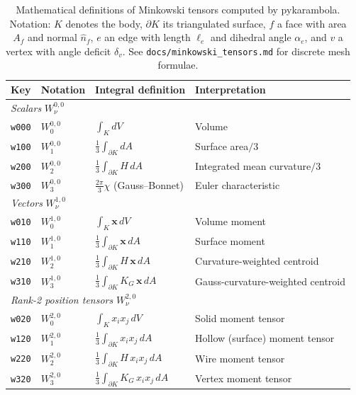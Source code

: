 \documentclass[times, twoside, watermark]{zHenriquesLab-StyleBioRxiv}
\newcommand{\newtxt}[1]{\textcolor{chgadded}{#1}}
\renewcommand{\added}[2][]{\newtxt{#2}}
\begin{document}
\added{%
\begin{table}[!ht]
\centering
\caption{%
  Mathematical definitions of Minkowski tensors computed by pykarambola.
  Notation: $K$ denotes the body, $\partial K$ its triangulated surface, $f$ a face with area $A_f$ and normal $\hat{n}_f$, $e$ an edge with length $\ell_e$ and dihedral angle $\alpha_e$, and $v$ a vertex with angle deficit $\delta_v$.
  See \texttt{docs/minkowski\_tensors.md} for discrete mesh formulae.
}
\label{tab:tensors}
\small
\begin{tabular}{llll}
\hline
\textbf{Key} & \textbf{Notation} & \textbf{Integral definition} & \textbf{Interpretation} \\
\hline
\multicolumn{4}{l}{\textit{Scalars} $W_\nu^{0,0}$} \\
\texttt{w000} & $W_0^{0,0}$ & $\int_K dV$ & Volume \\
\texttt{w100} & $W_1^{0,0}$ & $\frac{1}{3}\int_{\partial K} dA$ & Surface area$/3$ \\
\texttt{w200} & $W_2^{0,0}$ & $\frac{1}{3}\int_{\partial K} H\,dA$ & Integrated mean curvature$/3$ \\
\texttt{w300} & $W_3^{0,0}$ & $\frac{2\pi}{3}\chi$ (Gauss--Bonnet) & Euler characteristic \\
\hline
\multicolumn{4}{l}{\textit{Vectors} $W_\nu^{1,0}$} \\
\texttt{w010} & $W_0^{1,0}$ & $\int_K \mathbf{x}\,dV$ & Volume moment \\
\texttt{w110} & $W_1^{1,0}$ & $\frac{1}{3}\int_{\partial K} \mathbf{x}\,dA$ & Surface moment \\
\texttt{w210} & $W_2^{1,0}$ & $\frac{1}{3}\int_{\partial K} H\,\mathbf{x}\,dA$ & Curvature-weighted centroid \\
\texttt{w310} & $W_3^{1,0}$ & $\frac{1}{3}\int_{\partial K} K_G\,\mathbf{x}\,dA$ & Gauss-curvature-weighted centroid \\
\hline
\multicolumn{4}{l}{\textit{Rank-2 position tensors} $W_\nu^{2,0}$} \\
\texttt{w020} & $W_0^{2,0}$ & $\int_K x_i x_j\,dV$ & Solid moment tensor \\
\texttt{w120} & $W_1^{2,0}$ & $\frac{1}{3}\int_{\partial K} x_i x_j\,dA$ & Hollow (surface) moment tensor \\
\texttt{w220} & $W_2^{2,0}$ & $\frac{1}{3}\int_{\partial K} H\,x_i x_j\,dA$ & Wire moment tensor \\
\texttt{w320} & $W_3^{2,0}$ & $\frac{1}{3}\int_{\partial K} K_G\,x_i x_j\,dA$ & Vertex moment tensor \\

\end{tabular}
\end{table}}
\end{document}
